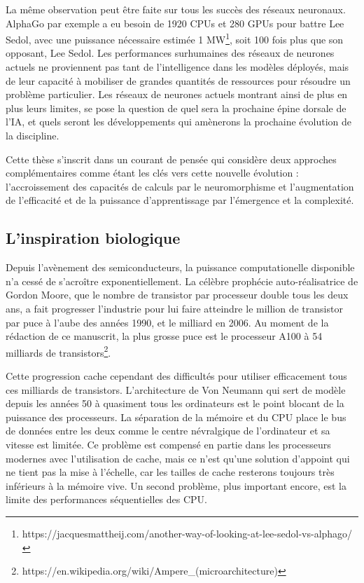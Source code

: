 	La même observation peut être faite sur tous les succès des réseaux neuronaux. AlphaGo par exemple a eu besoin de 1920 CPUs et 280 GPUs pour battre Lee Sedol, avec une puissance nécessaire estimée 1 MW\footnote{https://jacquesmattheij.com/another-way-of-looking-at-lee-sedol-vs-alphago/}, soit 100 fois plus que son opposant, Lee Sedol. Les performances surhumaines des réseaux de neurones actuels ne proviennent pas tant de l'intelligence dans les modèles déployés, mais de leur capacité à mobiliser de grandes quantités de ressources pour résoudre un problème particulier. Les réseaux de neurones actuels montrant ainsi de plus en plus leurs limites, se pose la question de quel sera la prochaine épine dorsale de l'IA, et quels seront les développements qui amènerons la prochaine évolution de la discipline. 
	
	Cette thèse s'inscrit dans un courant de pensée qui considère deux approches complémentaires comme étant les clés vers cette nouvelle évolution : l'accroissement des capacités de calculs par le neuromorphisme et l'augmentation de l'efficacité et de la puissance d'apprentissage par l'émergence et la complexité.

\subsection{L'inspiration biologique}

	Depuis l'avènement des semiconducteurs, la puissance computationelle disponible n'a cessé de s'acroître exponentiellement. La célèbre prophécie auto-réalisatrice de Gordon Moore, que le nombre de transistor par processeur double tous les deux ans, a fait progresser l'industrie pour lui faire atteindre le million de transistor par puce à l'aube des années 1990, et le milliard en 2006. Au moment de la rédaction de ce manuscrit, la plus grosse puce est le processeur A100 à 54 milliards de transistors\footnote{https://en.wikipedia.org/wiki/Ampere\_(microarchitecture)}.

	Cette progression cache cependant des difficultés pour utiliser efficacement tous ces milliards de transistors. L'architecture de Von Neumann \cite{von1993first} qui sert de modèle depuis les années 50 à quasiment tous les ordinateurs est le point blocant de la puissance des processeurs. La séparation de la mémoire et du CPU place le bus de données entre les deux comme le centre névralgique de l'ordinateur et sa vitesse est limitée. Ce problème est compensé en partie dans les processeurs modernes avec l'utilisation de cache, mais ce n'est qu'une solution d'appoint qui ne tient pas la mise à l'échelle, car les tailles de cache resterons toujours très inférieurs à la mémoire vive. Un second problème, plus important encore, est la limite des performances séquentielles des CPU. 
	
